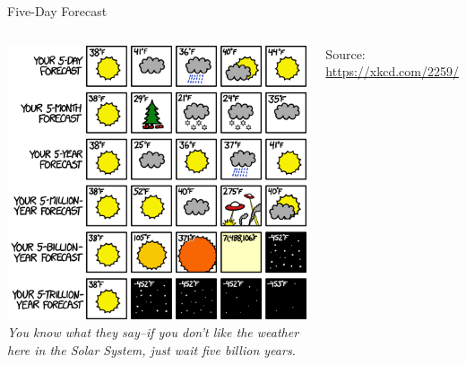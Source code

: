 \newcommand{\rx}[1]{\texttt{"{\color{olive}#1}"}}
\newcommand{\match}[1]{{\color{blue}#1}}
\newcommand{\qtt}[1]{\texttt{"{#1}"}}


\begin{frame}[t,plain]
\titlepage
\end{frame}


\begin{frame}[fragile]{Five-Day Forecast}
%
\begin{center}
\begin{columns}
\includegraphics[width=\linewidth]{./gfx/00-xkcd-five_day_forecast}
%
\emph{You know what they say--if you don't like the weather here in the Solar System, just wait five billion years.}

\vspace{6pt}
Source: \url{https://xkcd.com/2259/}

\end{columns}
\end{center}
%
\end{frame}


